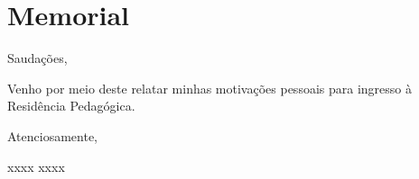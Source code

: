 \chapter{Memorial}
Saudações,

Venho por meio deste relatar minhas motivações pessoais para ingresso à Residência Pedagógica. 



Atenciosamente,

xxxx  xxxx